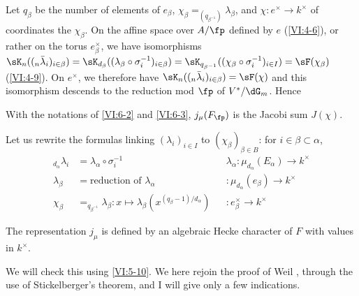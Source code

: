 Let $q_\beta$ be the number of elements of $e_\beta$,
$\chi_\beta=_{(q_{\beta^{-1}})} \lambda_\beta$, and
$\chi:e^\times \to k^\times$ of coordinates the $\chi_\beta$. On the
affine space over $A/\fp$ defined by $e$ (\ref{VI:4-6}), or rather on the torus
$e_\beta^\times$, we have isomorphisms 
$\sK_n((_n\bar\lambda_i)_{i\in\beta}) = \sK_{d_\beta}((\lambda_\beta \circ \sigma_i^{-1})_{i\in\beta}) =\sK_{q_{\beta^{-1}}}((\chi_\beta\circ \sigma_i^{-1})_{i\in I}) = \sF(\chi_\beta)$ (\ref{VI:4-9}). 
On $e^\times$, we therefore have $\sK_n((_n\bar\lambda_i)_{i\in \beta}) = \sF(\chi)$
and this isomorphism descends to the reduction mod $\fp$ of $V^\ast/\dG_m$.
Hence





\begin{proposition_}\label{VI:6-4}
With the notations of \ref{VI:6-2} and \ref{VI:6-3}, $j_\mu(F_\fp)$ is the
Jacobi sum $J(\chi)$.
\end{proposition_}

Let us rewrite the formulas linking $(\lambda_i)_{i\in I}$ to
$(\chi_\beta)_{\beta\in B}$: for $i\in \beta\subset \alpha$, 
\begin{align*}
  _{d_\alpha} \lambda_i &= \lambda_\alpha\circ \sigma_i^{-1} && \lambda_\alpha:\mu_{d_\alpha}(E_\alpha) \to k^\times \\
  \lambda_\beta &= \text{reduction of $\lambda_\alpha$} && :\mu_{d_\alpha}(e_\beta) \to k^\times \\
  \chi_\beta &= _{q_{\beta^{-1}}}\lambda_\beta: x\mapsto \lambda_\beta(x^{(q_\beta-1)/d_\alpha}) && :e_\beta^\times \to k^\times 
\end{align*}





\begin{theorem_}\label{VI:6-5}
The representation $j_\mu$ is defined by an algebraic Hecke
character of $F$ with values in $k^\times$.
\end{theorem_}

We will check this using \ref{VI:5-10}. We here rejoin the
proof of Weil \cite{we52,we74-2}, through the use of Stickelberger's
theorem, and I will give only a few indications. 





\subsection{}\label{VI:6-6}

